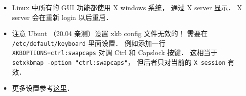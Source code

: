 
\begin{itemize}
\item Linux 中所有的 GUI 功能都使用 X windows 系统， 通过 X server 显示． X server 会在重新 login 以后重启．
\item 注意 Ubunt （20.04 亲测）设置 xkb config 文件无效的！ 需要在 \verb|/etc/default/keyboard| 里面设置． 例如添加一行 \verb|XKBOPTIONS=ctrl:swapcaps| 对调 Ctrl 和 Capslock 按键． 这相当于 \verb|setxkbmap -option "ctrl:swapcaps"|， 但后者只对当前的 \verb|X session| 有效．
\item 更多设置参考\href{https://gist.github.com/jatcwang/ae3b7019f219b8cdc6798329108c9aee}{这里}．
\end{itemize}

